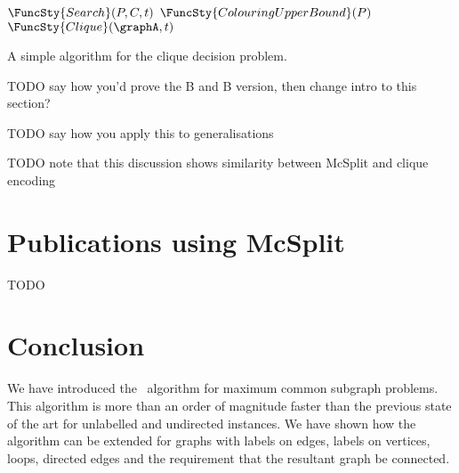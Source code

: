 \begin{algorithm}[h!]
\DontPrintSemicolon
\nl $\FuncSty{Search}(P,C,t)$ \;
\nl {}
\nl {}
\nl {}
\;
\nl $\FuncSty{ColouringUpperBound}(P)$ \;
\nl {}
\nl {}
\nl {}
\;
\nl $\FuncSty{Clique}(\graphA, t)$ \label{CliqueFun} \;
\nl {}
\nl {}
\nl {}
\caption{A simple algorithm for the clique decision problem.}
\label{CliqueDecisionAlg}
\end{algorithm}

TODO say how you'd prove the B and B version, then change intro to this section?

TODO say how you apply this to generalisations

TODO note that this discussion shows similarity between McSplit and clique encoding

\section{Publications using McSplit}

TODO

\section{Conclusion}

We have introduced the \McSplit\ algorithm for maximum common subgraph
problems.  This algorithm is more than an order of magnitude faster than the
previous state of the art for unlabelled and undirected instances. We have
shown how the algorithm can be extended for graphs with labels on edges, labels
on vertices, loops, directed edges and the requirement that the resultant graph
be connected.

